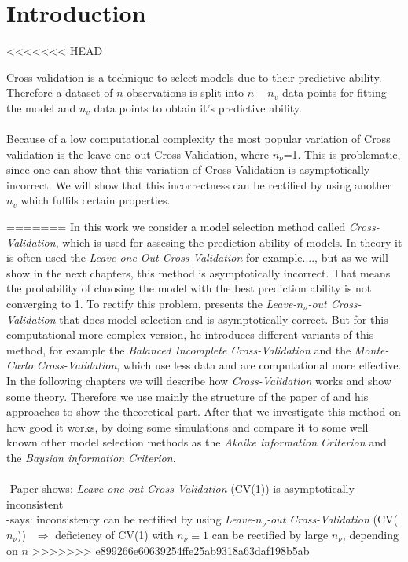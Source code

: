 \documentclass[Research_Module_ES.tex]{subfiles}
\begin{document}
\section{Introduction}	
<<<<<<< HEAD


















Cross validation is a technique to select models due to their predictive ability. Therefore a dataset of $n$ observations is split into $n-n_v$ data points for fitting the model and $n_v$ data points to obtain it's predictive ability.  \\
\\
Because of a low computational complexity the most popular variation of Cross validation is the leave one out Cross Validation, where $n_\nu$=1.
This is problematic, since one can show that this variation of Cross Validation is asymptotically incorrect. We will  show that this incorrectness can be rectified by using another $n_v$ which fulfils certain properties. 




=======
In this work we consider a model selection method  called \textit{Cross-Validation}, which is used for assesing the prediction ability of models.
In theory it is often used the \textit{Leave-one-Out Cross-Validation}
for example...., but as we will show in the next chapters, this method is asymptotically incorrect.
That means the probability of choosing the model with the best prediction ability is not converging to 1.
To rectify this problem, \cite{shao} presents the \textit{Leave-$n_\nu$-out Cross-Validation} that does model selection and is asymptotically correct. But for this computational more complex version, he introduces different variants of this method, for example the \textit{Balanced Incomplete Cross-Validation} and the \textit{Monte-Carlo Cross-Validation}, which use less data and are computational more effective. In the following chapters we will describe how \textit{Cross-Validation} works and show some theory. Therefore we use mainly the structure of the paper of \cite{shao} and his approaches to show the theoretical part. After that we investigate this method on how good it works, by doing some simulations and compare it to some well known other model selection methods as the \textit{Akaike information Criterion} and the \textit{Baysian information Criterion}.\\\\


-Paper shows: \textit{Leave-one-out Cross-Validation} (CV(1)) is asymptotically inconsistent\\
-says: inconsistency can be rectified by using \textit{Leave-$n_\nu$-out Cross-Validation} (CV($n_\nu$))
$~~\Rightarrow$ deficiency of CV(1) with $n_\nu\equiv 1$ can be rectified by large $n_\nu$, depending on $n$
>>>>>>> e899266e60639254ffe25ab9318a63daf198b5ab
\end{document}

